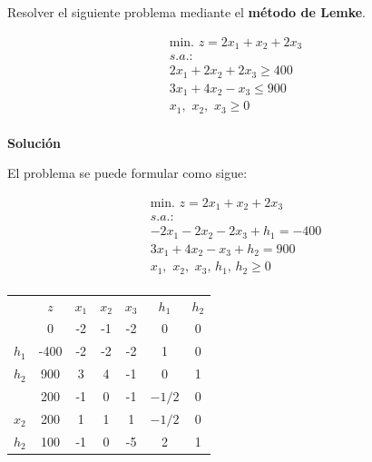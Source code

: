 Resolver el siguiente problema mediante el \textbf{método de Lemke}.

\begin{equation}
\begin{split}
\mbox{min. } z = 2x_1 + x_2 + 2x_3\\
s.a.:\\
2x_1 + 2x_2 + 2x_3 \geq 400\\
3x_1 + 4x_2 - x_3 \leq 900\\
x_1,\,\,x_2,\,\,x_3\geq 0\\
\end{split}
\end{equation}

\noindent
\textbf{Solución}

El problema se puede formular como sigue:

\begin{equation}
\begin{split}
\mbox{min. } z = 2x_1 + x_2 + 2x_3\\
s.a.:\\
-2x_1 - 2x_2 - 2x_3 +h_1 = -400\\
3x_1 + 4x_2 - x_3 + h_2 =  900\\
x_1,\,\,x_2,\,\,x_3,\,h_1,\,h_2\geq 0\\
\end{split}
\end{equation}

\begin{center}
\begin{tabular}{c|c|ccccc|}
 & $z$ & $x_1$ & $x_2$ & $x_3$ & $h_1$ & $h_2$\\ 
 & 0 & -2 & -1 & -2 & 0 & 0 \\ 
\hline
$h_1$ & -400  & -2 & -2 & -2 & 1 & 0\\ 
$h_2$ & 900  & 3 & 4 & -1 & 0 & 1\\ 
\hline
 & 200 & -1 & 0 & -1 & $-1/2$ & 0 \\ 
\hline
$x_2$ & 200  & 1 & 1 & 1 & $-1/2$ & 0\\ 
$h_2$ & 100  & -1 & 0 & -5 & 2 & 1\\ 
\hline
\end{tabular}
\end{center}

